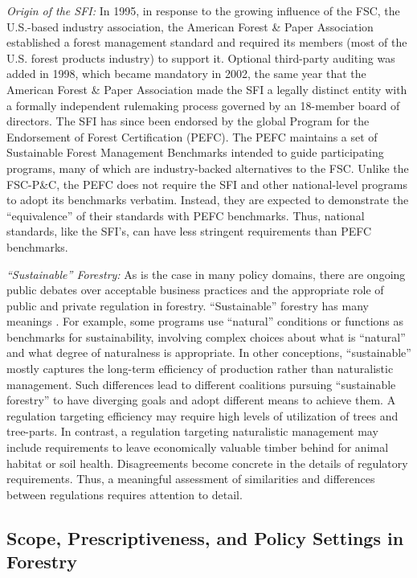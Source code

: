 \documentclass[
      12pt,
            Review ]{article}
\begin{document}
\emph{Origin of the SFI:} In 1995, in response to the growing influence of the FSC, the U.S.-based industry association, the American Forest \& Paper Association established a forest management standard and required its members (most of the U.S. forest products industry) to support it. Optional third-party auditing was added in 1998, which became mandatory in 2002, the same year that the American Forest \& Paper Association made the SFI a legally distinct entity with a formally independent rulemaking process governed by an 18-member board of directors. The SFI has since been endorsed by the global Program for the Endorsement of Forest Certification (PEFC). The PEFC maintains a set of Sustainable Forest Management Benchmarks intended to guide participating programs, many of which are industry-backed alternatives to the FSC. Unlike the FSC-P\&C, the PEFC does not require the SFI and other national-level programs to adopt its benchmarks verbatim. Instead, they are expected to demonstrate the ``equivalence'' of their standards with PEFC benchmarks. Thus, national standards, like the SFI's, can have less stringent requirements than PEFC benchmarks.

\emph{``Sustainable'' Forestry:} As is the case in many policy domains, there are ongoing public debates over acceptable business practices and the appropriate role of public and private regulation in forestry. ``Sustainable'' forestry has many meanings \citep{McDermott2012}. For example, some programs use ``natural'' conditions or functions as benchmarks for sustainability, involving complex choices about what is ``natural'' and what degree of naturalness is appropriate. In other conceptions, ``sustainable'' mostly captures the long-term efficiency of production rather than naturalistic management. Such differences lead to different coalitions pursuing ``sustainable forestry'' to have diverging goals and adopt different means to achieve them. A regulation targeting efficiency may require high levels of utilization of trees and tree-parts. In contrast, a regulation targeting naturalistic management may include requirements to leave economically valuable timber behind for animal habitat or soil health. Disagreements become concrete in the details of regulatory requirements. Thus, a meaningful assessment of similarities and differences between regulations requires attention to detail.

\hypertarget{scope-prescriptiveness-and-policy-settings-in-forestry}{%
\subsection{Scope, Prescriptiveness, and Policy Settings in Forestry}\label{scope-prescriptiveness-and-policy-settings-in-forestry}}
\end{document}
